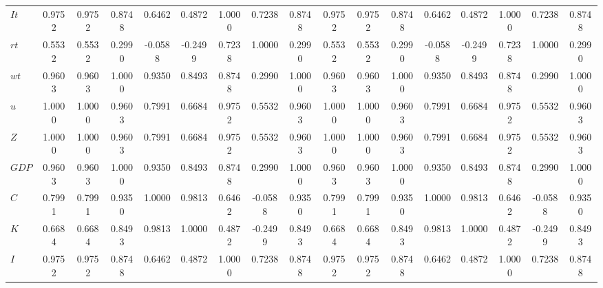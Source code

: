 \begin{center}
\begin{longtable}{lcccccccccccccccc}
$It        $	 & 	    0.9752	 & 	    0.9752	 & 	    0.8748	 & 	    0.6462	 & 	    0.4872	 & 	    1.0000	 & 	    0.7238	 & 	    0.8748	 & 	    0.9752	 & 	    0.9752	 & 	    0.8748	 & 	    0.6462	 & 	    0.4872	 & 	    1.0000	 & 	    0.7238	 & 	    0.8748 \\ 
$rt        $	 & 	    0.5532	 & 	    0.5532	 & 	    0.2990	 & 	   -0.0588	 & 	   -0.2499	 & 	    0.7238	 & 	    1.0000	 & 	    0.2990	 & 	    0.5532	 & 	    0.5532	 & 	    0.2990	 & 	   -0.0588	 & 	   -0.2499	 & 	    0.7238	 & 	    1.0000	 & 	    0.2990 \\ 
$wt        $	 & 	    0.9603	 & 	    0.9603	 & 	    1.0000	 & 	    0.9350	 & 	    0.8493	 & 	    0.8748	 & 	    0.2990	 & 	    1.0000	 & 	    0.9603	 & 	    0.9603	 & 	    1.0000	 & 	    0.9350	 & 	    0.8493	 & 	    0.8748	 & 	    0.2990	 & 	    1.0000 \\ 
$u         $	 & 	    1.0000	 & 	    1.0000	 & 	    0.9603	 & 	    0.7991	 & 	    0.6684	 & 	    0.9752	 & 	    0.5532	 & 	    0.9603	 & 	    1.0000	 & 	    1.0000	 & 	    0.9603	 & 	    0.7991	 & 	    0.6684	 & 	    0.9752	 & 	    0.5532	 & 	    0.9603 \\ 
$Z         $	 & 	    1.0000	 & 	    1.0000	 & 	    0.9603	 & 	    0.7991	 & 	    0.6684	 & 	    0.9752	 & 	    0.5532	 & 	    0.9603	 & 	    1.0000	 & 	    1.0000	 & 	    0.9603	 & 	    0.7991	 & 	    0.6684	 & 	    0.9752	 & 	    0.5532	 & 	    0.9603 \\ 
$GDP       $	 & 	    0.9603	 & 	    0.9603	 & 	    1.0000	 & 	    0.9350	 & 	    0.8493	 & 	    0.8748	 & 	    0.2990	 & 	    1.0000	 & 	    0.9603	 & 	    0.9603	 & 	    1.0000	 & 	    0.9350	 & 	    0.8493	 & 	    0.8748	 & 	    0.2990	 & 	    1.0000 \\ 
$C         $	 & 	    0.7991	 & 	    0.7991	 & 	    0.9350	 & 	    1.0000	 & 	    0.9813	 & 	    0.6462	 & 	   -0.0588	 & 	    0.9350	 & 	    0.7991	 & 	    0.7991	 & 	    0.9350	 & 	    1.0000	 & 	    0.9813	 & 	    0.6462	 & 	   -0.0588	 & 	    0.9350 \\ 
$K         $	 & 	    0.6684	 & 	    0.6684	 & 	    0.8493	 & 	    0.9813	 & 	    1.0000	 & 	    0.4872	 & 	   -0.2499	 & 	    0.8493	 & 	    0.6684	 & 	    0.6684	 & 	    0.8493	 & 	    0.9813	 & 	    1.0000	 & 	    0.4872	 & 	   -0.2499	 & 	    0.8493 \\ 
$I         $	 & 	    0.9752	 & 	    0.9752	 & 	    0.8748	 & 	    0.6462	 & 	    0.4872	 & 	    1.0000	 & 	    0.7238	 & 	    0.8748	 & 	    0.9752	 & 	    0.9752	 & 	    0.8748	 & 	    0.6462	 & 	    0.4872	 & 	    1.0000	 & 	    0.7238	 & 	    0.8748 \\ 

\end{longtable}
\end{center}
